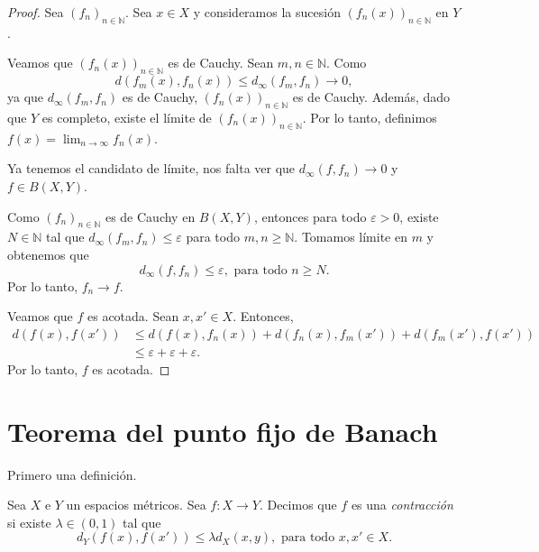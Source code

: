 \begin{proof}
	Sea $(f_n)_{n \in \mathbb{N}}$. Sea $x \in X$ y consideramos la sucesión $(f_n (x))_{n \in \mathbb{N}}$ en $Y$.

	Veamos que $(f_n (x))_{n \in \mathbb{N}}$ es de Cauchy. Sean $m, n \in \mathbb{N}$. Como
	\begin{equation*}
		d(f_m (x), f_n (x)) \leq d_{\infty} (f_m, f_n) \longrightarrow 0,
	\end{equation*}
	ya que $d_{\infty} (f_m, f_n)$ es de Cauchy, $(f_n (x))_{n \in \mathbb{N}}$ es de Cauchy. Además, dado que $Y$ es completo, existe el límite de $(f_n(x))_{n \in \mathbb{N}}$. Por lo tanto, definimos $f(x) = \lim_{n \to \infty} f_n (x)$.

	Ya tenemos el candidato de límite, nos falta ver que $d_{\infty}(f, f_n) \longrightarrow 0$ y $f \in B(X, Y)$.

	Como $(f_n)_{n \in \mathbb{N}}$ es de Cauchy en $B(X, Y)$, entonces para todo $\varepsilon > 0$, existe $N \in \mathbb{N}$ tal que $d_{\infty} (f_m, f_n) \leq \varepsilon$ para todo $m, n \geq \mathbb{N}$. Tomamos límite en $m$ y obtenemos que
	\begin{equation*}
		d_{\infty} (f, f_n) \leq \varepsilon, \text{ para todo } n \geq N.
	\end{equation*}
	Por lo tanto, $f_n \longrightarrow f$.

	Veamos que $f$ es acotada. Sean $x, x' \in X$. Entonces,
	\begin{align*}
		d(f(x), f(x')) & \leq d(f(x), f_n (x)) + d(f_n (x), f_m (x')) + d(f_m(x'), f(x')) \\
		               & \leq \varepsilon + \varepsilon + \varepsilon.
	\end{align*}
	Por lo tanto, $f$ es acotada.
\end{proof}

\section{Teorema del punto fijo de Banach}

Primero una definición.

\begin{definition}
	Sea $X$ e $Y$ un espacios métricos. Sea $f : X \to Y$. Decimos que $f$ es una \emph{contracción} si existe $\lambda \in (0, 1)$ tal que
	\begin{equation*}
		d_Y(f(x), f(x')) \leq \lambda d_X(x, y), \text{ para todo }x, x' \in X.
	\end{equation*}
\end{definition}

